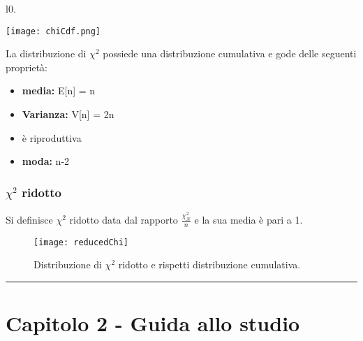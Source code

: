 \begin{wrapfigure}[7]{l}{0.\textwidth}
\centering

\texttt{[image: chiCdf.png]}	

\end{wrapfigure}

\noindent La distribuzione di $\chi^2$ possiede una distribuzione cumulativa e gode delle seguenti propriet\`{a}:

\begin{itemize}
	\item \textbf{media:} E[n] = n
	\item \textbf{Varianza:} V[n] = 2n
	\item \`{e} riproduttiva
	\item \textbf{moda:} n-2
	\end{itemize}
	
\subsubsection{$\chi^2$ ridotto}

Si definisce $\chi^2$ ridotto data dal rapporto $\frac{\chi^2_N}{n}$ e la sua media \`{e} pari a 1.

 
\begin{figure}[ht]
\vspace{0.in}
\texttt{[image: reducedChi]}	
\centering
\vspace{0.in}
\caption{Distribuzione di $\chi^2$ ridotto e rispetti distribuzione cumulativa.}
\end{figure}

\vspace{0.05cm}
\par\noindent\rule{\textwidth}{2pt}

\section{Capitolo 2 - Guida allo studio}

